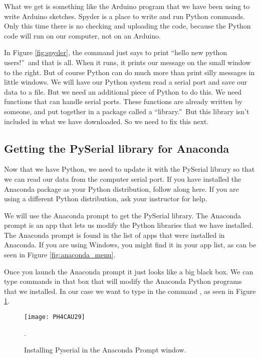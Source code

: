 What we get is something like the Arduino program that we have been using to
write Arduino sketches. Spyder is a place to write and run Python commands.
Only this time there is no checking and uploading the code, because the
Python code will run on our computer, not on an Arduino.

In Figure \ref{fig:spyder}, 
the command just says to print \textquotedblleft hello
new python users!\textquotedblright\ and that is all. When it runs, it
prints our message on the small window to the right. But of course Python
can do much more than print silly messages in little windows. We will have
our Python system read a serial port and save our data to a file. But we
need an additional piece of Python to do this. We need functions that can
handle serial ports. These functions are already written by someone, and put
together in a package called a \textquotedblleft library.\textquotedblright\
But this library isn't included in what we have downloaded. So we need to
fix this next.

\subsection{Getting the PySerial library for Anaconda}

Now that we have Python, we need to update it with the PySerial library so
that we can read our data from the computer serial port. If you have
installed the Anaconda package as your Python distribution, follow along
here. 
If you are using a different Python distribution, ask your instructor for help.

We will use the Anaconda prompt to get the PySerial library. The Anaconda
prompt is an app that lets us modify the Python libraries that we have
installed. The Anaconda prompt is found in the list of apps that were
installed in Anaconda. If you are using Windows, you might find it in your
app list, as can be seen in Figure \ref{fig:anaconda_menu}.

Once you launch the Anaconda prompt it just looks like a big black box. 
We can type commands in that box
that will modify the Anaconda Python programs that we installed. In our case
we want to type in the command \code{conda install pyserial}, as seen in
Figure \ref{fig:pyserial_install}.
\begin{figure}[htbp!]
    \centering
\texttt{[image: PH4CAU29]}
    \caption[Installing Pyserial in the Anaconda Prompt window]
    {Installing Pyserial in the Anaconda Prompt window.}
    \label{fig:pyserial_install}.
\end{figure}

